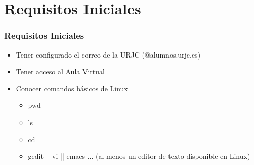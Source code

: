 \section{Requisitos Iniciales}

\begin{frame}
\frametitle{Requisitos Iniciales}

\begin{itemize}
	\item Tener configurado el correo de la URJC (@alumnos.urjc.es)
	\item Tener acceso al Aula Virtual
	\item Conocer comandos básicos de Linux
	\begin{itemize}
		\item pwd
		\item ls
		\item cd
		\item gedit || vi || emacs ... (al menos un editor de texto disponible en Linux)
	\end{itemize}
\end{itemize}

\end{frame}
